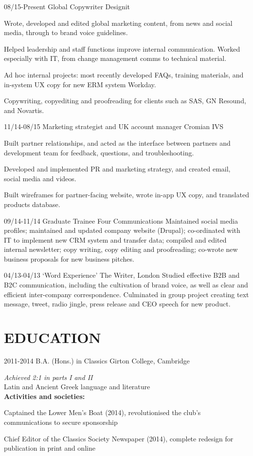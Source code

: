 \documentclass[]{friggeri-cv}
\begin{document}
\begin{entrylist}
  \entry
  {08/15-Present}
  {Global Copywriter}
  {Designit}
  {
  	Wrote, developed and edited global marketing content, from news and social media, through to brand voice guidelines.
  	
  	Helped leadership and staff functions improve internal communication. Worked especially with IT, from change management comms to technical material. 
  	
  	Ad hoc internal projects: most recently developed FAQs, training materials, and in-system UX copy for new ERM system Workday. 
  	
  	Copywriting, copyediting and proofreading for clients such as SAS, GN Resound, and Novartis.	 
  }
  \entry
  {11/14-08/15}
  {Marketing strategist and UK account manager}
  {Cromian IVS}
  {
  	Built partner relationships, and acted as the interface between partners and development team for feedback, questions, and troubleshooting.
  	
  	Developed and implemented PR and marketing strategy, and created email, social media and videos. 
  	
  	Built wireframes for partner-facing website, wrote in-app UX copy, and translated products database.
  }
  \entry
  {09/14-11/14}
  {Graduate Trainee}
  {Four Communications}
  {Maintained social media profiles; maintained and updated company website (Drupal); co-ordinated with IT to implement new CRM system and transfer data; compiled and edited internal newsletter; copy writing, copy editing and proofreading; co-wrote new business proposals for new business pitches.}
\end{entrylist}
\begin{entrylist}
  \entry
  {04/13-04/13}
  {‘Word Experience’}
  {The Writer, London}
  {Studied effective B2B and B2C communication, including the cultivation of brand voice, as well as clear and efficient inter-company correspondence. Culminated in group project creating text message, tweet, radio jingle, press release and CEO speech for new product.}
\end{entrylist}

\pagebreak

\section{EDUCATION}

\begin{entrylist}
	\entry
	{2011-2014}
	{B.A. (Hons.) in Classics}
	{Girton College, Cambridge}
	{\emph{Achieved 2:1 in parts I and II}
	\\
	
	Latin and Ancient Greek language and literature
	\\
	
	\textbf{Activities and societies:} 
	
	Captained the Lower Men's Boat (2014), revolutionised the club's communications to secure sponsorship
	
	Chief Editor of the Classics Society Newspaper (2014), complete redesign for publication in print and online
	}
\end{entrylist}
\end{document}
